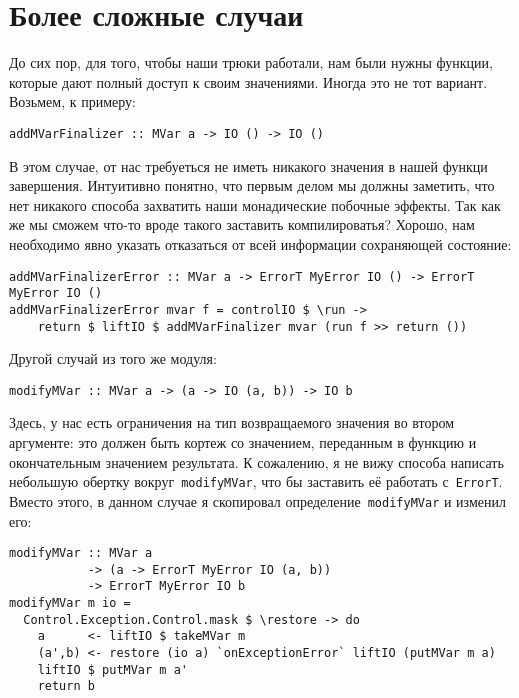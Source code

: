 \section{Более сложные случаи}
До сих пор, для того, чтобы наши трюки работали, нам были нужны функции,
которые дают полный доступ к своим значениями. Иногда это не тот вариант.
Возьмем, к примеру:

\begin{lstlisting}
addMVarFinalizer :: MVar a -> IO () -> IO ()
\end{lstlisting}

В этом случае, от нас требуеться не иметь никакого значения в нашей функци
завершения. Интуитивно понятно, что первым делом мы должны заметить, что нет
никакого способа захватить наши монадические побочные эффекты. Так как же мы
сможем что-то вроде такого заставить компилироватья? Хорошо, нам необходимо
явно указать отказаться от всей информации сохраняющей состояние:

\begin{lstlisting}
addMVarFinalizerError :: MVar a -> ErrorT MyError IO () -> ErrorT MyError IO ()
addMVarFinalizerError mvar f = controlIO $ \run ->
    return $ liftIO $ addMVarFinalizer mvar (run f >> return ())
\end{lstlisting}

Другой случай из того же модуля:

\begin{lstlisting}
modifyMVar :: MVar a -> (a -> IO (a, b)) -> IO b
\end{lstlisting}

Здесь, у нас есть ограничения на тип возвращаемого значения во втором
аргументе: это должен быть кортеж со значением, переданным в функцию и
окончательным значением результата. К сожалению, я не вижу способа написать
небольшую обертку вокруг~\lstinline'modifyMVar', что бы заставить её работать с~\lstinline'ErrorT'.
Вместо этого, в данном случае я скопировал определение~\lstinline'modifyMVar' и изменил
его:

\begin{lstlisting}
modifyMVar :: MVar a
           -> (a -> ErrorT MyError IO (a, b))
           -> ErrorT MyError IO b
modifyMVar m io =
  Control.Exception.Control.mask $ \restore -> do
    a      <- liftIO $ takeMVar m
    (a',b) <- restore (io a) `onExceptionError` liftIO (putMVar m a)
    liftIO $ putMVar m a'
    return b
\end{lstlisting}
